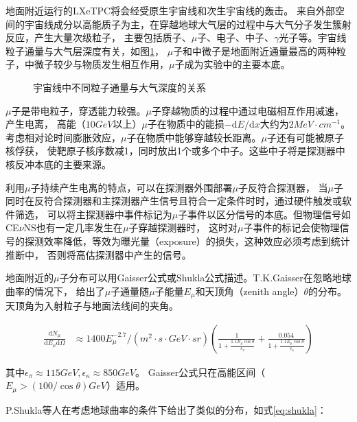 地面附近运行的LXeTPC将会经受原生宇宙线和次生宇宙线的轰击。
来自外部空间的宇宙线成分以高能质子为主，在穿越地球大气层的过程中与大气分子发生簇射反应，产生大量次级粒子，
主要包括质子、$\mu$子、电子、中子、$\gamma$光子等。宇宙线粒子通量与大气层深度有关，如图\ref{fig:vertical_flux}，
$\mu$子和中微子是地面附近通量最高的两种粒子，中微子较少与物质发生相互作用，$\mu$子成为实验中的主要本底。

\begin{figure}
    \centering
    
    \caption{\label{fig:vertical_flux} 宇宙线中不同粒子通量与大气深度的关系\cite{olive_review_2016}}
\end{figure}

$\mu$子是带电粒子，穿透能力较强。$\mu$子穿越物质的过程中通过电磁相互作用减速，产生电离，
高能（$10\si{GeV}$以上）$\mu$子在物质中的能损$-\mathrm{d}E/\mathrm{d}x$大约为$2\si{MeV\cdot cm^{-1}}$。
考虑相对论时间膨胀效应，$\mu$子在物质中能够穿越较长距离。$\mu$子还有可能被原子核俘获，
使靶原子核序数减1，同时放出1个或多个中子。这些中子将是探测器中核反冲本底的主要来源。

利用$\mu$子持续产生电离的特点，可以在探测器外围部署$\mu$子反符合探测器，
当$\mu$子同时在反符合探测器和主探测器产生信号且符合一定条件时时，通过硬件触发或软件筛选，
可以将主探测器中事件标记为$\mu$子事件以区分信号的本底。但物理信号如CE$\nu$NS也有一定几率发生在$\mu$子穿越探测器时，
这时对$\mu$子事件的标记会使物理信号的探测效率降低，等效为曝光量（exposure）的损失，这种效应必须考虑到统计推断中，
否则将高估探测器中产生的信号。

地面附近的$\mu$子分布可以用Gaisser公式或Shukla公式描述。T.K.Gaisser在忽略地球曲率的情况下，
给出了$\mu$子通量随$\mu$子能量$E_\mu$和天顶角（zenith angle）$\theta$的分布。天顶角为入射粒子与地面法线间的夹角\cite{gaisser_cosmic_2016}。

\begin{align}
    \label{eq:gaisser}
    \frac{\mathrm{d}N_\mu}{\mathrm{d}E_\mu\mathrm{d}\Omega} &\approx 
    1400E_\mu^{-2.7}/\left(\si{m^2\cdot s\cdot GeV\cdot sr}\right)\left(\frac{1}{1+\frac{1.1E_\mu\cos\theta}{\epsilon_\pi}}+\frac{0.054}{1+\frac{1.1E_\mu\cos\theta}{\epsilon_\kappa}}\right)
\end{align}

其中$\epsilon_\pi\approx115\si{GeV},\epsilon_\kappa\approx850\si{GeV}$。
Gaisser公式只在高能区间（$E_\mu>(100/\cos\theta)\si{GeV}$）适用。

P.Shukla等人在考虑地球曲率的条件下给出了类似的分布\cite{shukla_energy_2018}，如式\ref{eq:shukla}：

